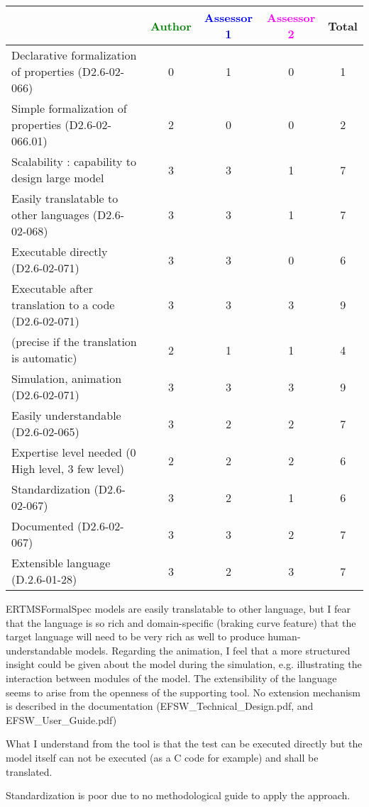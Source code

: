 \begin{tabular}{|l | c | c | c | c|}
\hline
& \textcolor{green}{Author} & \textcolor{blue}{Assessor 1} & \textcolor{magenta}{Assessor 2} & Total \\
\hline
Declarative formalization of properties (D2.6-02-066) & 0 & 1 & 0 & 1 \\
\hline
Simple formalization of properties (D2.6-02-066.01) & 2 & 0 & 0 & 2 \\
\hline
Scalability : capability to design large model & 3 & 3 & 1 & 7 \\
\hline
Easily translatable to other languages (D2.6-02-068) & 3 & 3 & 1 & 7 \\
\hline
Executable directly (D2.6-02-071) & 3 & 3 & 0 & 6 \\
\hline
Executable after translation to a code (D2.6-02-071) & 3 & 3 & 3 & 9 \\
(precise if the translation is automatic) & 2 & 1 & 1 & 4 \\
\hline
Simulation, animation (D2.6-02-071) & 3 & 3 & 3 & 9 \\
\hline
Easily understandable (D2.6-02-065) & 3 & 2 & 2 & 7 \\
\hline
Expertise level needed (0 High level, 3 few level) & 2 & 2 & 2 & 6 \\
\hline
Standardization (D2.6-02-067) & 3 & 2 & 1 & 6 \\
\hline
Documented (D2.6-02-067) & 3 & 3 & 2 & 7 \\
\hline
Extensible language (D.2.6-01-28) & 3 & 2 & 3 & 7 \\
\hline
\end{tabular}

\begin{assessor1}
ERTMSFormalSpec models are easily translatable to other language, but I fear that the language is so rich and domain-specific (braking curve feature) that the target language will need to be very rich as well to produce human-understandable models. Regarding the animation, I feel that a more structured insight could be given about the model during the simulation, e.g. illustrating the interaction between modules of the model. The extensibility of the language seems to arise from the openness of the supporting tool. No extension mechanism is described in the documentation (EFSW\_Technical\_Design.pdf, and EFSW\_User\_Guide.pdf)
\end{assessor1}


\begin{assessor2}
What I understand from the tool is that the test can be executed directly but the model itself can not be executed (as a C code for example)  and shall be translated.

Standardization is poor due to no methodological guide to apply the approach.
\end{assessor2}

